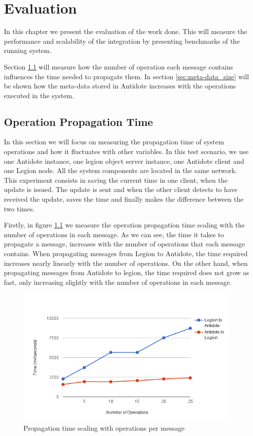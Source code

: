 \chapter{Evaluation}
\label{cha:evaluation}
In this chapter we present the evaluation of the work done. This will measure the performance and scalability of the integration by presenting benchmarks of the running system.\par
	Section \ref{sec:operation_propagation_time} will measure how the number of operation each message contains influences the time needed to propagate them. In section \ref{sec:meta-data_size} will be shown how the meta-data stored in Antidote increases with the operations executed in the system.

\section{Operation Propagation Time}
\label{sec:operation_propagation_time}
In this section we will focus on measuring the propagation time of system operations and how it fluctuates with other variables. In this test scenario, we use one Antidote instance, one legion object server instance, one Antidote client and one Legion node. All the system components are located in the same network. This experiment consists in saving the current time in one client, when the update is issued. The update is sent and when the other client detects to have received the update, saves the time and finally makes the difference between the two times.\par
	Firstly, in figure \ref{graph1} we measure the operation propagation time scaling with the number of operations in each message. As we can see, the time it takes to propagate a message, increases with the number of operations that each message contains. When propagating messages from Legion to Antidote, the time required increases nearly linearly with the number of operations. On the other hand, when propagating messages from Antidote to legion, the time required does not grow as fast, only increasing slightly with the number of operations in each message.

\begin{figure}[H]
\centering
\includegraphics[scale=0.7]{files/graph1.png}
\caption{Propagation time scaling with operations per message}
\label{graph1}
\end{figure}


